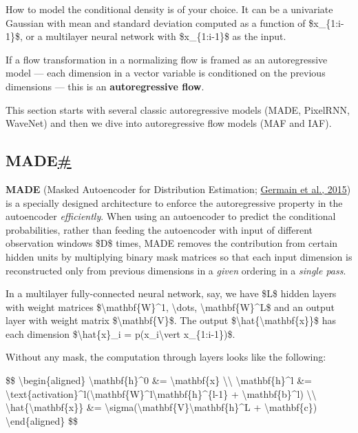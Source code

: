 How to model the conditional density is of your choice. It can be a univariate Gaussian with mean and standard deviation computed as a function of \$x\_\{1:i-1\}\$, or a multilayer neural network with \$x\_\{1:i-1\}\$ as the input.

If a flow transformation in a normalizing flow is framed as an autoregressive model --- each dimension in a vector variable is conditioned on the previous dimensions --- this is an \textbf{autoregressive flow}.

This section starts with several classic autoregressive models (MADE, PixelRNN, WaveNet) and then we dive into autoregressive flow models (MAF and IAF).

\subsection{\texorpdfstring{MADE\hyperref[made]{\#}}{MADE\#}}\label{made}

\textbf{MADE} (Masked Autoencoder for Distribution Estimation; \href{https://arxiv.org/abs/1502.03509}{Germain et al., 2015}) is a specially designed architecture to enforce the autoregressive property in the autoencoder \emph{efficiently}. When using an autoencoder to predict the conditional probabilities, rather than feeding the autoencoder with input of different observation windows \$D\$ times, MADE removes the contribution from certain hidden units by multiplying binary mask matrices so that each input dimension is reconstructed only from previous dimensions in a \emph{given} ordering in a \emph{single pass}.

In a multilayer fully-connected neural network, say, we have \$L\$ hidden layers with weight matrices \$\textbackslash mathbf\{W\}\^{}1, \textbackslash dots, \textbackslash mathbf\{W\}\^{}L\$ and an output layer with weight matrix \$\textbackslash mathbf\{V\}\$. The output \$\textbackslash hat\{\textbackslash mathbf\{x\}\}\$ has each dimension \$\textbackslash hat\{x\}\_i = p(x\_i\textbackslash vert x\_\{1:i-1\})\$.

Without any mask, the computation through layers looks like the following:

\$\$ \textbackslash begin\{aligned\} \textbackslash mathbf\{h\}\^{}0 \&= \textbackslash mathbf\{x\} \textbackslash\textbackslash{} \textbackslash mathbf\{h\}\^{}l \&= \textbackslash text\{activation\}\^{}l(\textbackslash mathbf\{W\}\^{}l\textbackslash mathbf\{h\}\^{}\{l-1\} + \textbackslash mathbf\{b\}\^{}l) \textbackslash\textbackslash{} \textbackslash hat\{\textbackslash mathbf\{x\}\} \&= \textbackslash sigma(\textbackslash mathbf\{V\}\textbackslash mathbf\{h\}\^{}L + \textbackslash mathbf\{c\}) \textbackslash end\{aligned\} \$\$

